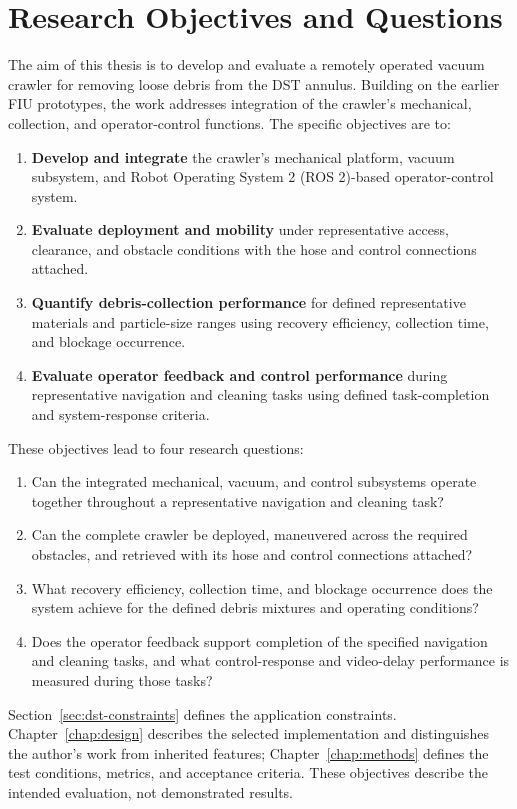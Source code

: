 \section{Research Objectives and Questions}
\label{sec:research-objectives}
The aim of this thesis is to develop and evaluate a remotely operated vacuum crawler for removing loose debris from the DST annulus. Building on the earlier FIU prototypes, the work addresses integration of the crawler's mechanical, collection, and operator-control functions. The specific objectives are to:

\begin{enumerate}
\item \textbf{Develop and integrate} the crawler's mechanical platform, vacuum subsystem, and Robot Operating System 2 (ROS 2)-based operator-control system.
\item \textbf{Evaluate deployment and mobility} under representative access, clearance, and obstacle conditions with the hose and control connections attached.
\item \textbf{Quantify debris-collection performance} for defined representative materials and particle-size ranges using recovery efficiency, collection time, and blockage occurrence.
\item \textbf{Evaluate operator feedback and control performance} during representative navigation and cleaning tasks using defined task-completion and system-response criteria.
\end{enumerate}

These objectives lead to four research questions:
\begin{enumerate}
\item Can the integrated mechanical, vacuum, and control subsystems operate together throughout a representative navigation and cleaning task?
\item Can the complete crawler be deployed, maneuvered across the required obstacles, and retrieved with its hose and control connections attached?
\item What recovery efficiency, collection time, and blockage occurrence does the system achieve for the defined debris mixtures and operating conditions?
\item Does the operator feedback support completion of the specified navigation and cleaning tasks, and what control-response and video-delay performance is measured during those tasks?
\end{enumerate}

Section~\ref{sec:dst-constraints} defines the application constraints. Chapter~\ref{chap:design} describes the selected implementation and distinguishes the author's work from inherited features; Chapter~\ref{chap:methods} defines the test conditions, metrics, and acceptance criteria. These objectives describe the intended evaluation, not demonstrated results.

